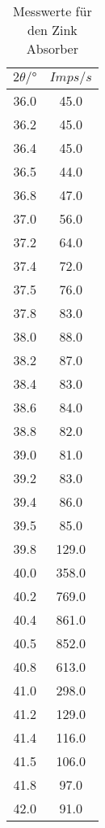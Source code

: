 \begin{table}[H]
    \centering
    \caption{Messwerte für den Zink Absorber}
    \label{tab:4}
    \begin{tabular}{c c}
        \toprule
        $2 \theta /° $ & $Imps/s$ \\
        \midrule
        36.0  &	45.0 \\
        36.2  &	45.0 \\
        36.4  &	45.0 \\
        36.5  &	44.0 \\
        36.8  &	47.0 \\
        37.0  &	56.0 \\
        37.2  &	64.0 \\
        37.4  &	72.0 \\
        37.5  &	76.0 \\
        37.8  &	83.0 \\
        38.0  &	88.0 \\
        38.2  &	87.0 \\
        38.4  &	83.0 \\
        38.6  &	84.0 \\
        38.8  &	82.0 \\
        39.0  &	81.0 \\
        39.2  &	83.0 \\
        39.4  &	86.0 \\
        39.5  &	85.0 \\
        39.8  &	129.0  \\
        40.0  &	358.0  \\
        40.2  &	769.0  \\
        40.4  &	861.0  \\
        40.5  &	852.0  \\
        40.8  &	613.0  \\
        41.0  &	298.0  \\
        41.2  &	129.0  \\
        41.4  &	116.0  \\
        41.5  &	106.0  \\
        41.8  &	97.0  \\
        42.0  &	91.0  \\
        \bottomrule
    \end{tabular}
\end{table}

